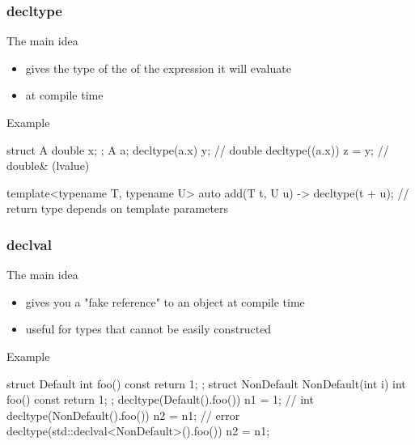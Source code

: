 \begin{frame}[fragile]
  \frametitle{decltype}
  \begin{block}{The main idea}
    \begin{itemize}
    \item gives the type of the of the expression it will evaluate
    \item at compile time
    \end{itemize}
  \end{block}
  \begin{exampleblock}{Example}
    \begin{cppcode*}{}
      struct A { double x; };
      A a;
      decltype(a.x) y;       // double
      decltype((a.x)) z = y; // double& (lvalue)
 
      template<typename T, typename U>
      auto add(T t, U u) -> decltype(t + u);
      // return type depends on template parameters
    \end{cppcode*}
  \end{exampleblock}  
\end{frame}

\begin{frame}[fragile]
  \frametitle{declval}
  \begin{block}{The main idea}
    \begin{itemize}
    \item gives you a "fake reference" to an object at compile time
    \item useful for types that cannot be easily constructed
    \end{itemize}
  \end{block}
  \begin{exampleblock}{Example}
    \begin{cppcode*}{}
      struct Default {
        int foo() const { return 1; }
      };
      struct NonDefault {
        NonDefault(int i) { }
        int foo() const { return 1; }
      }; 
      decltype(Default().foo()) n1 = 1;     // int
      decltype(NonDefault().foo()) n2 = n1; // error
      decltype(std::declval<NonDefault>().foo()) n2 = n1;
    \end{cppcode*}
  \end{exampleblock}  
\end{frame}

